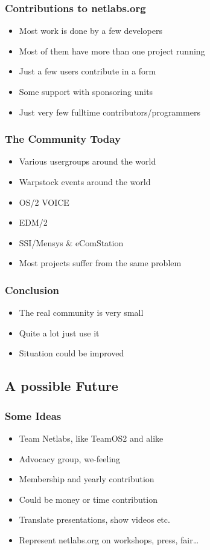 \documentclass{beamer}
\begin{document}
\begin{frame}
\frametitle{Contributions to netlabs.org}
\begin{itemize}[<+->]
  \item Most work is done by a few developers
  \item Most of them have more than one project running
  \item Just a few users contribute in a form
  \item Some support with sponsoring units
  \item Just very few fulltime contributors/programmers
\end{itemize}
\end{frame}

\begin{frame}
\frametitle{The Community Today}
\begin{itemize}[<+->]
  \item Various usergroups around the world
  \item Warpstock events around the world
  \item OS/2 VOICE
  \item EDM/2
  \item SSI/Mensys \& eComStation
  \item Most projects suffer from the same problem
\end{itemize}
\end{frame}

\begin{frame}
\frametitle{Conclusion}
\begin{itemize}[<+->]
  \item The real community is very small
  \item Quite a lot just use it
  \item Situation could be improved
\end{itemize}
\end{frame}

\subsection{A possible Future}
\begin{frame}
\frametitle{Some Ideas}
\begin{itemize}[<+->]
  \item Team Netlabs, like TeamOS2 and alike
  \item Advocacy group, we-feeling
  \item Membership and yearly contribution
  \item Could be money or time contribution
  \item Translate presentations, show videos etc.
  \item Represent netlabs.org on workshops, press, fair\ldots
\end{itemize}
\end{frame}
\end{document}
